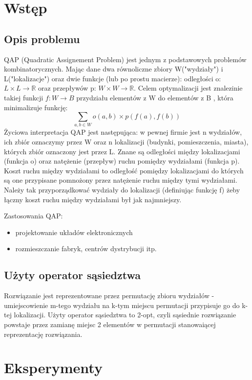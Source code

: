 \documentclass{article}
\begin{document}



\section{Wstęp}
	\subsection{Opis problemu}
	QAP (Quadratic Assignement Problem) jest jednym z podstawowych problemów kombinatorycznych. Mając dane dwa równoliczne zbiory W("wydziały") i L("lokalizacje") oraz dwie funkcje (lub po prostu macierze): odległości o: $ L \times L \rightarrow \mathbb{R} $ oraz przepływów p: $ W \times W \rightarrow \mathbb{R} $. Celem optymalizacji jest znalezinie takiej funkcji $ f: W \rightarrow B $  przydziału elementów z W do elementów z B , która minimalizuje funkcję:
	$$\sum_{a,b \in W}o(a,b)\times p(f(a),f(b))$$
	Życiowa interpretacja QAP jest następująca: w pewnej firmie jest n wydziałów, ich zbiór oznaczymy przez W oraz n lokalizacji (budynki, pomieszczenia, miasta), których zbiór oznaczony jest przez L. Znane są odległości między lokalizacjami (funkcja o) oraz natężenie (przepływ) ruchu pomiędzy wydziałami (funkcja p). Koszt ruchu między wydziałami to odległość pomiędzy lokalizacjami do których są one przypisane pomnożony przez natężenie ruchu między tymi wydziałami. Należy tak przyporządkować wydziały do lokalizacji (definiując funkcję f) żeby łączny koszt ruchu między wydziałami był jak najmniejszy.

	Zastosowania QAP:
	\begin{itemize}
		\item{projektowanie układów elektronicznych}
		\item{rozmieszczanie fabryk, centrów dystrybucji itp.}
	\end{itemize}

	\subsection{Użyty operator sąsiedztwa}
	Rozwiązanie jest reprezentowane przez permutację zbioru wydziałów - umiejscowienie m-tego wydziału na k-tym miejscu permutacji przypisuje go do k-tej lokalizacji.
	Użyty operator sąsiedztwa to 2-opt, czyli sąsiednie rozwiązanie powstaje przez zamianę miejsc 2 elementów w permutacji stanowaiącej reprezentację rozwiązania.

\section{Eksperymenty}
\end{document}
